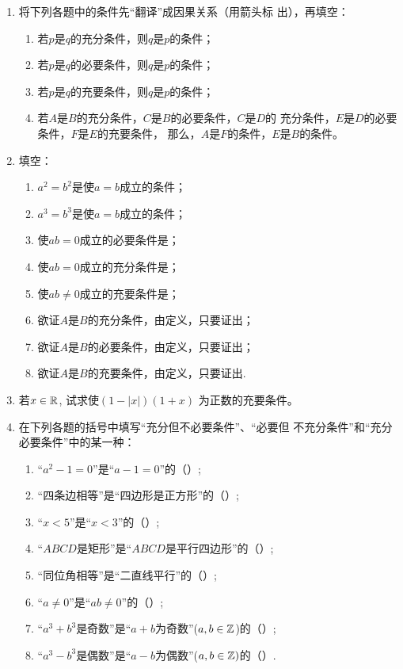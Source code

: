 \begin{enumerate}
    \item 将下列各题中的条件先“翻译”成因果关系（用箭头标
    出），再填空：
    \begin{enumerate}[(1)]
    \item 若$p$是$q$的充分条件，则$q$是$p$的\blank 条件；
    \item 若$p$是$q$的必要条件，则$q$是$p$的\blank 条件；
    \item 若$p$是$q$的充要条件，则$q$是$p$的\blank 条件；
    \item 若$A$是$B$的充分条件，$C$是$B$的必要条件，$C$是$D$的
    充分条件，$E$是$D$的必要条件，$F$是$E$的充要条件，
    那么，$A$是$F$的\blank 条件，$E$是$B$的\blank 条件。    
    \end{enumerate}
\item 填空：
\begin{enumerate}[(1)]
    \item $a^{2}=b^{2}$是使$a=b$成立的\blank 条件；
    \item  $a^{3}=b^{3}$是使$a=b$成立的\blank 条件；
    \item 使$ab=0$成立的必要条件是\blank ；
    \item 使$ab=0$成立的充分条件是\blank ；
    \item 使$ab\ne 0$成立的充要条件是\blank ； 
    \item 欲证$A$是$B$的充分条件，由定义，只要证出\blank ；
    \item  欲证$A$是$B$的必要条件，由定义，只要证出\blank ；
    \item 欲证$A$是$B$的充要条件，由定义，只要证出\blank .
\end{enumerate}    
    
\item 若$x\in\mathbb{R}$, 试求使$(1-|x|)(1+x)$
为正数的充要条件。
\item 在下列各题的括号中填写“充分但不必要条件”、“必要但
不充分条件”和“充分必要条件”中的某一种：
\begin{enumerate}[(1)]
    \item “$a^2-1=0$”是“$a-1=0$”的（\qquad\qquad）;
    \item “四条边相等”是“四边形是正方形”的（\qquad\qquad）;
    \item “$x<5$”是“$x<3$”的（\qquad\qquad）;
    \item “$ABCD$是矩形”是“$ABCD$是平行四边形”的（\qquad\qquad）;
    \item “同位角相等”是“二直线平行”的（\qquad\qquad）;
    \item “$a\ne 0$”是“$ab\ne 0$”的（\qquad\qquad）;
    \item “$a^3+b^3$是奇数”是“$a+b$为奇数”($a,b\in \mathbb{Z}$)的（\qquad\qquad）;
    \item “$a^{3}-b^{3}$是偶数”是“$a-b$为偶数”($a,b\in \mathbb{Z})$的（\qquad\qquad）.
\end{enumerate}
\end{enumerate}

